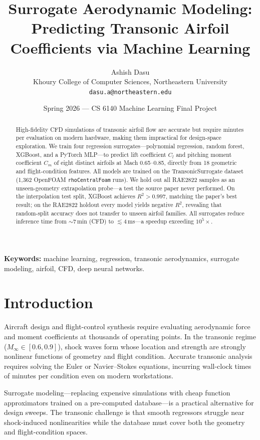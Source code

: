 \documentclass[11pt]{article}
\title{\textbf{Surrogate Aerodynamic Modeling:\\
Predicting Transonic Airfoil Coefficients via Machine Learning}}
\author{Ashish Dasu\\
\small Khoury College of Computer Sciences, Northeastern University\\
\small \texttt{dasu.a@northeastern.edu}}
\date{Spring 2026 --- CS 6140 Machine Learning Final Project}
\begin{document}
\maketitle

\begin{abstract}
High-fidelity CFD simulations of transonic airfoil flow are accurate but
require minutes per evaluation on modern hardware, making them impractical
for design-space exploration. We train four regression surrogates---polynomial
regression, random forest, XGBoost, and a PyTorch MLP---to predict lift
coefficient $C_l$ and pitching moment coefficient $C_m$ of eight distinct
airfoils at Mach 0.65--0.85, directly from 18 geometric and flight-condition
features. All models are trained on the TransonicSurrogate dataset
\cite{elrefaie2024} (1,362 OpenFOAM \texttt{rhoCentralFoam} runs). We hold
out all RAE2822 samples as an unseen-geometry extrapolation probe---a test
the source paper never performed. On the interpolation test split, XGBoost
achieves $R^2>0.997$, matching the paper's best result; on the RAE2822 holdout
every model yields negative $R^2$, revealing that random-split accuracy does
not transfer to unseen airfoil families. All surrogates reduce inference time
from $\sim$7\,min (CFD) to $\lesssim$4\,ms---a speedup exceeding $10^5\times$.
\end{abstract}

\textbf{Keywords:} machine learning, regression, transonic aerodynamics,
surrogate modeling, airfoil, CFD, deep neural networks.

\section{Introduction}

Aircraft design and flight-control synthesis require evaluating aerodynamic
force and moment coefficients at thousands of operating points. In the
transonic regime ($M_\infty \in [0.6, 0.9]$), shock waves form whose location
and strength are strongly nonlinear functions of geometry and flight condition.
Accurate transonic analysis requires solving the Euler or Navier--Stokes
equations, incurring wall-clock times of minutes per condition even on modern
workstations.

Surrogate modeling---replacing expensive simulations with cheap function
approximators trained on a pre-computed database---is a practical alternative
for design sweeps. The transonic challenge is that smooth regressors struggle
near shock-induced nonlinearities while the database must cover both the
geometry and flight-condition spaces.
\end{document}
